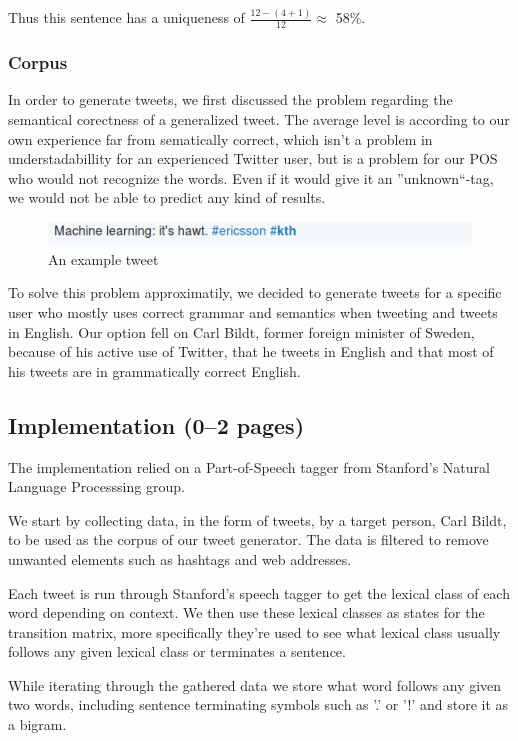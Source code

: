 \documentclass[a4paper,12pt]{article}
\begin{document}
Thus this sentence has a uniqueness of $\frac{12 - (4 + 1)}{12} \approx$ 58\%.

\subsubsection{Corpus}
In order to generate tweets, we first discussed the problem regarding the semantical corectness of a generalized tweet.
The average level is according to our own experience far from sematically correct, which isn't a problem in understadabillity for an experienced Twitter user,
but is a problem for our POS who would not recognize the words. Even if it would give it an ''unknown``-tag, we would not be able to predict any kind of results.

\begin{figure}[h!]
  \centering
  \includegraphics[width=1\linewidth]{machine_learning}
  \caption{An example tweet}
\end{figure}

To solve this problem approximatily, we decided to generate tweets for a specific user who mostly uses correct grammar and semantics when tweeting and tweets in English.
Our option fell on Carl Bildt, former foreign minister of Sweden, because of his active use of Twitter, 
that he tweets in English and that most of his tweets are in grammatically correct English.

\subsection{Implementation (0--2 pages)}
\label{sec:impl}
The implementation relied on a Part-of-Speech tagger from Stanford's Natural Language Processsing group.

We start by collecting data, in the form of tweets, by a target person, Carl Bildt, to be used as the corpus of our tweet generator. The data is filtered to remove unwanted elements such as hashtags and web addresses.

Each tweet is run through Stanford's speech tagger to get the lexical class of each word depending on context.
We then use these lexical classes as states for the transition matrix, more specifically they're used to see what lexical class usually follows any given lexical class or terminates a sentence.

While iterating through the gathered data we store what word follows any given two words, including sentence terminating symbols such as '.' or '!' and store it as a bigram.
\end{document}
